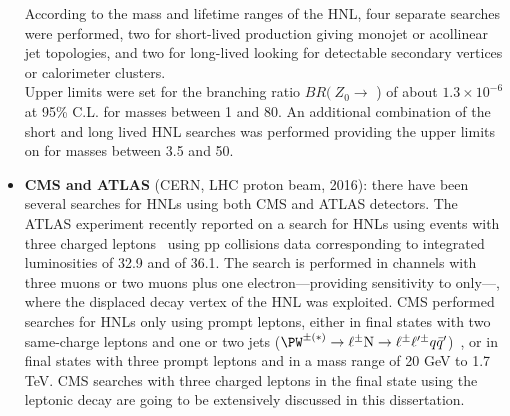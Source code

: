 \begin{itemize}
  According to the mass and lifetime ranges of the HNL, four separate searches were performed, two for short-lived \hnl production giving monojet or acollinear jet topologies, 
  and two for long-lived \hnl looking for detectable secondary vertices or calorimeter clusters.\\
 Upper limits were set for the branching ratio $BR (\: Z_0\rightarrow$ \hnl) of
 about $1.3 \times 10^{-6}$ at 95\% C.L. for \hnl masses between 1 and
 80\GeV. An additional combination of the short and long lived HNL searches was performed providing the upper limits on \mixpar for \hnl masses between 3.5 and
 50\GeV. 
\item \textbf{CMS and ATLAS} (CERN, LHC proton beam, 2016): there have
  been several searches for HNLs using both CMS and ATLAS detectors.
The ATLAS experiment recently reported on a search for HNLs using events with three charged leptons~\cite{atlasintro2} using 
pp collisions data corresponding to integrated luminosities of 32.9
and of
36.1\fbinv. 
The search is performed in channels with three muons or two muons plus
one electron---providing sensitivity  to \mixparm only---, where the 
displaced decay vertex of the HNL was exploited.
CMS performed searches for HNLs only using prompt leptons,
either in final states with two same-charge leptons and one or two jets
(\(\PW^{\pm(\ast)}\to\ell^{\pm}\hnl\to\ell^{\pm}\ell^{\prime\pm}q\bar{q}^{\prime}\))~\cite{Sirunyan:2018xiv},
or in final states with three prompt leptons and \ptmiss 
in a mass range of 20 GeV to 1.7 TeV.
CMS searches with three charged leptons in the final state using the leptonic \PW decay are going to be extensively discussed in this
dissertation.
\end{itemize}

